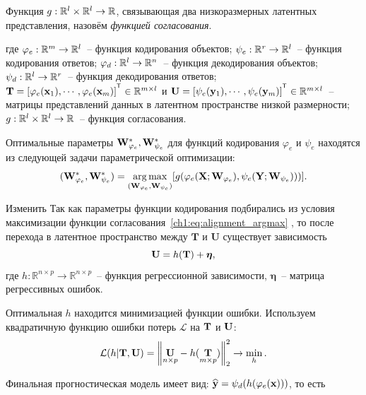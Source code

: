 \hrulefill

\begin{definition}
	Функция $g: \mathbb{R}^l \times \mathbb{R}^l \to \mathbb{R}$, связывающая два низкоразмерных латентных представления, назовём \textit{функцией согласования}.
\end{definition}
где $\varphi_e: \mathbb{R}^m \to \mathbb{R}^l$~--  функция кодирования объектов; $\psi_e: \mathbb{R}^r \to \mathbb{R}^l$~--  функция кодирования ответов; $\varphi_d: \mathbb{R}^l \to \mathbb{R}^n$~--  функция декодирования объектов; $\psi_d: \mathbb{R}^l \to \mathbb{R}^r$~--  функция декодирования ответов; $\bT = [\varphi_e(\bx_1), \cdots, \varphi_e(\bx_m)]^{\T}  \in \bbR^{m\times l}$ и $\bU =[\psi_e(\by_1), \cdots, \psi_e(\by_m)]^{\T} \in \bbR^{m\times l}$~-- матрицы представлений данных в латентном пространстве низкой размерности; $g: \mathbb{R}^l \times \mathbb{R}^l \to \mathbb{R}$~-- функция согласования.

Оптимальные параметры $\mathbf{W}_{\varphi_e}^{*}, \mathbf{W}_{\psi_e}^{*}$ для функций кодирования $\varphi_e$  и $\psi_e$ находятся из следующей задачи параметрической оптимизации:
\begin{equation}
(\mathbf{W}_{\varphi_e}^{*}, \mathbf{W}_{\psi_e}^{*}) = \mathop{\arg \max}\limits_{(\mathbf{W}_{\varphi_e}, \mathbf{W}_{\psi_e})} [g(\varphi_e(\mathbf{X}; \mathbf{W}_{\varphi_e}), \psi_e(\mathbf{Y}; \mathbf{W}_{\psi_e})))].
\label{ch1:eq:alignment_argmax}
\end{equation}

{\color{red} Изменить} Так как параметры функции кодирования подбирались из условия максимизации функции согласования~\eqref{ch1:eq:alignment_argmax} , то после перехода в латентное пространство между $\mathbf{T}$ и $\mathbf{U}$ существует зависимость
\begin{equation}
\mathbf{U} = h(\mathbf{T}) +  \boldsymbol{\eta},
\label{ch1:eq:alignment_regression}
\end{equation}
где $h: \mathbb{R}^{n \times p} \to \mathbb{R}^{n \times p}$~-- функция регрессионной зависимости,  $\boldsymbol{\eta}$~-- матрица регрессивных ошибок.

Оптимальная $h$ находится минимизацией функции ошибки. Используем квадратичную функцию ошибки потерь $\mathcal{L}$ на $\mathbf{T}$ и $\mathbf{U}$:
\begin{equation}
\mathcal{L}(h | {\mathbf{T}}, {\mathbf{U}}) = {\left\| \underset{n \times p}{\mathbf{U}}  - h(\underset{m \times p}{\mathbf{T}}) \right\| }_2^2 \rightarrow\min_{h}.
\label{ch1:eq:alignment_regression_loss}
\end{equation}

Финальная прогностическая модель имеет вид:
$\widehat{\mathbf{y}} = \psi_d(h(\varphi_e(\mathbf{x})))$, то есть

